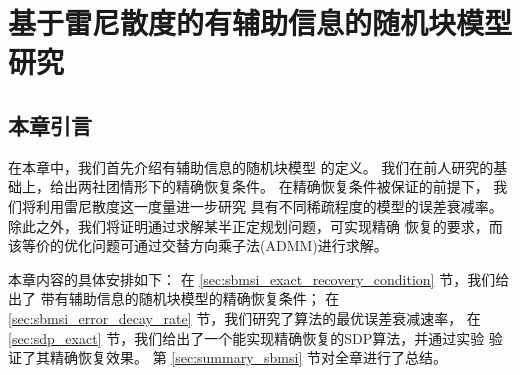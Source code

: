 \chapter{基于雷尼散度的有辅助信息的随机块模型研究}
\label{chap:sbmsi}
\section{本章引言}
在本章中，我们首先介绍有辅助信息的随机块模型
的定义。
我们在前人研究的基础上，给出两社团情形下的精确恢复条件。
在精确恢复条件被保证的前提下，
我们将利用雷尼散度这一度量进一步研究
具有不同稀疏程度的模型的误差衰减率。
除此之外，我们将证明通过求解某半正定规划问题，可实现精确
恢复的要求，而该等价的优化问题可通过交替方向乘子法(ADMM)进行求解。

本章内容的具体安排如下：
在 \ref{sec:sbmsi_exact_recovery_condition} 节，我们给出了
带有辅助信息的随机块模型的精确恢复条件；
在 \ref{sec:sbmsi_error_decay_rate} 节，我们研究了算法的最优误差衰减速率，
在 \ref{sec:sdp_exact} 节，我们给出了一个能实现精确恢复的SDP算法，并通过实验
验证了其精确恢复效果。
第 \ref{sec:summary_sbmsi} 节对全章进行了总结。

